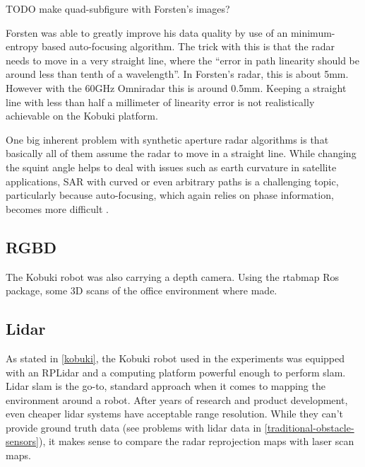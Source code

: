 TODO make quad-subfigure with Forsten's images?

Forsten was able to greatly
improve his data quality by use of an minimum-entropy based
auto-focusing algorithm. The trick with this is that the radar needs to
move in a very straight line, where the ``error in path linearity should
be around less than tenth of a wavelength''. In Forsten's radar, this is
about 5mm. However with the 60GHz Omniradar this is around 0.5mm.
Keeping a straight line with less than half a millimeter of linearity
error is not realistically achievable on the Kobuki platform.



One big inherent problem with synthetic aperture radar algorithms is
that basically all of them assume the radar to move in a straight line.
While changing the squint angle helps to deal with issues such as earth
curvature in satellite applications, SAR with curved or even arbitrary
paths is a challenging topic, particularly because auto-focusing, which
again relies on phase information, becomes more difficult
\cite{Axelsson2002}.

\subsection{RGBD}\label{rgbd-1}

The Kobuki robot was also carrying a depth camera. Using the rtabmap Ros
package, some 3D scans of the office environment where made.

\subsection{Lidar}\label{lidar-1}

As stated in \cref{kobuki}, the Kobuki robot used in the experiments was
equipped with an RPLidar and a computing platform powerful enough to
perform slam. Lidar slam is the go-to, standard approach when it comes
to mapping the environment around a robot. After years of research and
product development, even cheaper lidar systems have acceptable range
resolution. While they can't provide ground truth data (see problems
with lidar data in \cref{traditional-obstacle-sensors}), it makes sense to compare the radar
reprojection maps with laser scan maps.
